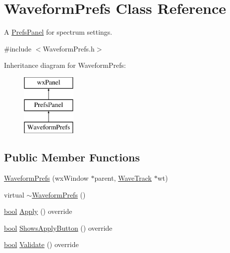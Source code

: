 \hypertarget{class_waveform_prefs}{}\section{Waveform\+Prefs Class Reference}
\label{class_waveform_prefs}


A \hyperlink{class_prefs_panel}{Prefs\+Panel} for spectrum settings.  




{\ttfamily \#include $<$Waveform\+Prefs.\+h$>$}

Inheritance diagram for Waveform\+Prefs\+:\begin{figure}[H]
\begin{center}
\leavevmode
\includegraphics[height=3.000000cm]{class_waveform_prefs}
\end{center}
\end{figure}
\subsection*{Public Member Functions}
\begin{DoxyCompactItemize}
\item 
\hyperlink{class_waveform_prefs_ab75e5e3ebc2070e694d0e09321dc708f}{Waveform\+Prefs} (wx\+Window $\ast$parent, \hyperlink{class_wave_track}{Wave\+Track} $\ast$wt)
\item 
virtual \hyperlink{class_waveform_prefs_a020dfd294dff03b326ecdce4fced1cd0}{$\sim$\+Waveform\+Prefs} ()
\item 
\hyperlink{mac_2config_2i386_2lib-src_2libsoxr_2soxr-config_8h_abb452686968e48b67397da5f97445f5b}{bool} \hyperlink{class_waveform_prefs_a8c9c6fa79e7f1a616354523545dc3839}{Apply} () override
\item 
\hyperlink{mac_2config_2i386_2lib-src_2libsoxr_2soxr-config_8h_abb452686968e48b67397da5f97445f5b}{bool} \hyperlink{class_waveform_prefs_a869ce8fbb3b7e7347dcc02e11d1d3c68}{Shows\+Apply\+Button} () override
\item 
\hyperlink{mac_2config_2i386_2lib-src_2libsoxr_2soxr-config_8h_abb452686968e48b67397da5f97445f5b}{bool} \hyperlink{class_waveform_prefs_aea4e9e52a2ccb3aa85bc3e3b97a797d4}{Validate} () override
\end{DoxyCompactItemize}


